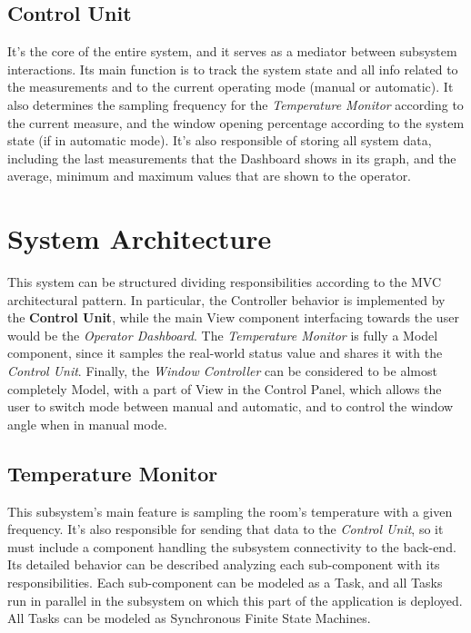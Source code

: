 \documentclass[a4paper,12pt]{report}
\begin{document}
	\section{Control Unit}
	It's the core of the entire system, and it serves as a mediator between subsystem interactions. Its main function is to track the system state and all info related to the measurements and to the current operating mode (manual or automatic). It also determines the sampling frequency for the \textit{Temperature Monitor} according to the current measure, and the window opening percentage according to the system state (if in automatic mode). It's also responsible of storing all system data, including the last measurements that the Dashboard shows in its graph, and the average, minimum and maximum values that are shown to the operator.
	
	\chapter{System Architecture}
	This system can be structured dividing responsibilities according to the MVC architectural pattern.
	\newline In particular, the Controller behavior is implemented by the \textbf{Control Unit}, while the main View component interfacing towards the user would be the \textit{Operator Dashboard}. The \textit{Temperature Monitor} is fully a Model component, since it samples the real-world status value and shares it with the \textit{Control Unit}. Finally, the \textit{Window Controller} can be considered to be almost completely Model, with a part of View in the Control Panel, which allows the user to switch mode between manual and automatic, and to control the window angle when in manual mode.
	\section{Temperature Monitor}
	This subsystem's main feature is sampling the room's temperature with a given frequency. It's also responsible for sending that data to the \textit{Control Unit}, so it must include a component handling the subsystem connectivity to the back-end.
	\newline Its detailed behavior can be described analyzing each sub-component with its responsibilities. Each sub-component can be modeled as a Task, and all Tasks run in parallel in the subsystem on which this part of the application is deployed. All Tasks can be modeled as Synchronous Finite State Machines.
\end{document}
